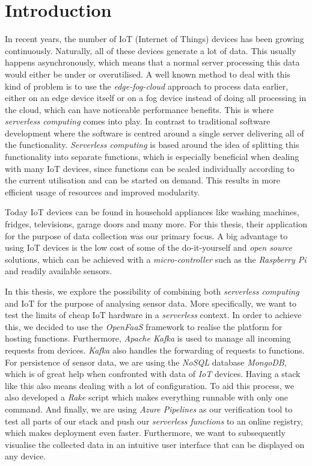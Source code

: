 \chapter{Introduction}
\label{sec:introduction}

In recent years, the number of IoT (Internet of Things) devices has been growing continuously.
Naturally, all of these devices generate a lot of data. This usually happens asynchronously, which
means that a normal server processing this data would either be under or overutilised. A well known
method to deal with this kind of problem is to use the \textit{edge-fog-cloud} approach to process
data earlier, either on an edge device itself or on a fog device instead of doing all processing in
the cloud, which can have noticeable performance benefits. This is where \textit{serverless
computing} comes into play. In contrast to traditional software development where the software is
centred around a single server delivering all of the functionality. \textit{Serverless computing} is
based around the idea of splitting this functionality into separate functions, which is especially
beneficial when dealing with many IoT devices, since functions can be scaled individually according
to the current utilisation and can be started on demand. This results in more efficient usage of
resources and improved modularity.

Today IoT devices can be found in household appliances like washing machines, fridges, televisions,
garage doors and many more. For this thesis, their application for the purpose of data collection
was our primary focus. A big advantage to using IoT devices is the low cost of some of the
do-it-yourself and \textit{open source} solutions, which can be achieved with a
\textit{micro-controller} such as the \textit{Raspberry Pi} and readily available
 sensors.

In this thesis, we explore the possibility of combining both \textit{serverless computing} and IoT
for the purpose of analysing sensor data. More specifically, we want to test the limits of cheap IoT
hardware in a \textit{serverless} context. In order to achieve this, we decided to use the
\textit{OpenFaaS} framework to realise the platform for hosting functions. Furthermore,
\textit{Apache Kafka} is used to manage all incoming requests from devices. \textit{Kafka} also
handles the forwarding of requests to functions. For persistence of sensor data, we are using the
\textit{NoSQL} database \textit{MongoDB}, which is of great help when confronted with data of
\textit{IoT} devices. Having a stack like this also means dealing with a lot of configuration. To
aid this process, we also developed a \textit{Rake} script which makes everything runnable with only
one command. And finally, we are using \textit{Azure Pipelines} as our verification tool to test all
parts of our stack and push our \textit{serverless functions} to an online registry, which makes
deployment even faster. Furthermore, we want to subsequently visualise the collected data in an
intuitive user interface that can be displayed on any device.

